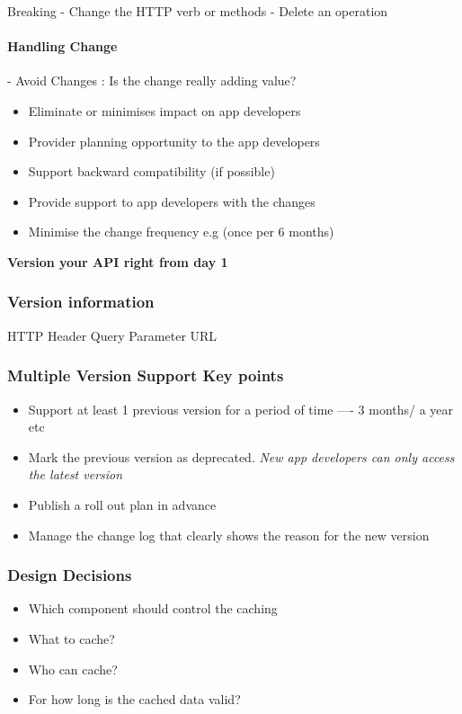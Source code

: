 Breaking
- Change the HTTP verb or methods
- Delete an operation

\paragraph{Handling Change}
- Avoid Changes : Is the change really adding value?
\begin{itemize}
    \item Eliminate or minimises impact on app developers
    \item Provider planning opportunity to the app developers
    \item Support backward compatibility (if possible)
    \item Provide support to app developers with the changes
    \item Minimise the change frequency e.g (once per 6 months)
\end{itemize}
\textbf{Version your API right from day 1}

\subsubsection{Version information}
HTTP Header
Query Parameter
URL

\subsubsection{Multiple Version Support Key points}
\begin{itemize}
    \item Support at least 1 previous version for a period of time ---- 3 months/ a year etc
    \item Mark the previous version as deprecated. \textit{New app developers can only access the latest version}
    \item Publish a roll out plan in advance
    \item Manage the change log that clearly shows the reason for the new version
\end{itemize}

\subsubsection{Design Decisions}
\begin{itemize}
    \item Which component should control the caching
    \item What to cache?
    \item Who can cache?
    \item For how long is the cached data valid?
\end{itemize}

